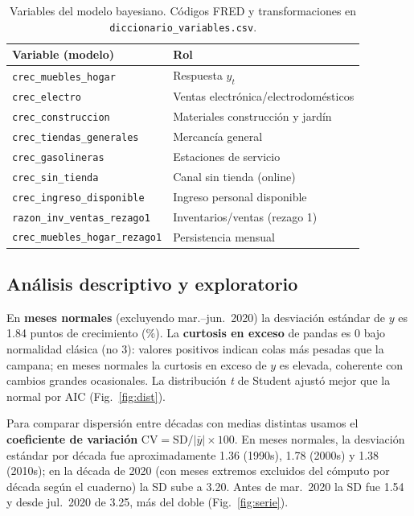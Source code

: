 \documentclass[twocolumn,10pt]{article}
\begin{document}
\begin{table}[!ht]
\centering
\scriptsize
\begin{tabular}{@{}p{}p{}@{}}
\hline
\textbf{Variable (modelo)} & \textbf{Rol} \\
\hline
\texttt{crec\_muebles\_hogar} & Respuesta $y_t$ \\
\texttt{crec\_electro} & Ventas electrónica/electrodomésticos \\
\texttt{crec\_construccion} & Materiales construcción y jardín \\
\texttt{crec\_tiendas\_generales} & Mercancía general \\
\texttt{crec\_gasolineras} & Estaciones de servicio \\
\texttt{crec\_sin\_tienda} & Canal sin tienda (online) \\
\texttt{crec\_ingreso\_disponible} & Ingreso personal disponible \\
\texttt{razon\_inv\_ventas\_rezago1} & Inventarios/ventas (rezago 1) \\
\texttt{crec\_muebles\_hogar\_rezago1} & Persistencia mensual \\
\hline
\end{tabular}
\caption{Variables del modelo bayesiano. Códigos FRED y transformaciones en \texttt{diccionario\_variables.csv}.}
\label{tab:diccionario}
\end{table}

\subsection{Análisis descriptivo y exploratorio}
En \textbf{meses normales} (excluyendo mar.--jun.\ 2020) la desviación estándar de $y$ es 1.84 puntos de crecimiento (\%). La \textbf{curtosis en exceso} de pandas es 0 bajo normalidad clásica (no 3): valores positivos indican colas más pesadas que la campana; en meses normales la curtosis en exceso de $y$ es elevada, coherente con cambios grandes ocasionales. La distribución \textit{t} de Student ajustó mejor que la normal por AIC (Fig.~\ref{fig:dist}).

Para comparar dispersión entre décadas con medias distintas usamos el \textbf{coeficiente de variación} $\mathrm{CV}=\mathrm{SD}/|\bar{y}|\times 100$. En meses normales, la desviación estándar por década fue aproximadamente 1.36 (1990s), 1.78 (2000s) y 1.38 (2010s); en la década de 2020 (con meses extremos excluidos del cómputo por década según el cuaderno) la SD sube a 3.20. Antes de mar.\ 2020 la SD fue 1.54 y desde jul.\ 2020 de 3.25, más del doble (Fig.~\ref{fig:serie}).
\end{document}
